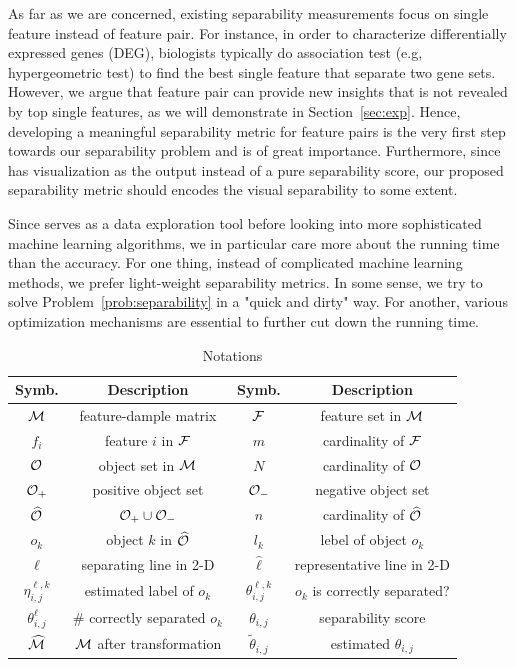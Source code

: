  As far as we are concerned, existing separability measurements focus on single feature instead of feature pair. For instance, in order to characterize differentially expressed genes (DEG), biologists typically do association test (e.g, hypergeometric test) to find the best single feature that separate two gene sets. However, we argue that feature pair can provide new insights that is not revealed by top single features, as we will demonstrate in Section~\ref{sec:exp}. Hence, developing a meaningful separability metric for feature pairs is the very first step towards our separability problem and is of great importance. Furthermore, since \genviz has visualization as the output instead of a pure separability score, our proposed separability metric should encodes the visual separability to some extent. 

 Since \genviz serves as a data exploration tool before looking into more sophisticated machine learning algorithms, we in particular care more about the running time than the accuracy. For one thing, instead of complicated machine learning methods, we prefer light-weight separability metrics. In some sense, we try to solve Problem~\ref{prob:separability} in a "quick and dirty" way. For another, various optimization mechanisms are essential to further cut down the running time.

\begin{table}[t!]
\centering
\small
\begin{tabular}{c|c|c|c}
   Symb. & Description & Symb. & Description\\
    \hline
    \hline
    $\mm$ & feature-dample matrix & $\ff$ & feature set in $\mm$ \\
    \hline
    $f_i$ & feature $i$ in $\ff$ & $m$ & cardinality of $\ff$\\
    \hline
    $\oo$ & object set in $\mm$ & $N$ & cardinality of $\oo$\\
    \hline
    $\oo_+$ & positive object set & $\oo_-$ & negative object set\\
    \hline
    $\widehat{\oo}$ & $\oo_+\cup \oo_-$ & $n$ & cardinality of $\widehat{\oo}$\\
    \hline
    $o_k$ & object $k$ in $\widehat{\oo}$ & $l_k$ & lebel of object $o_k$\\
    \hline
    $\ell$ & separating line in 2-D & $\hat{\ell}$ & representative line  in 2-D\\
    \hline
    $\eta_{i,j}^{\ell,k}$ & estimated label of $o_k$ & $\theta_{i,j}^{\ell,k}$ & $o_k$ is correctly separated? \\
    \hline
    $\theta_{i,j}^{\ell}$ & \# correctly separated $o_k$ & $\theta_{i,j}$ & separability score\\
    \hline
    $\widehat{\mm}$ & $\mm$ after transformation &  $\tilde{\theta}_{i,j}$ & estimated $\theta_{i,j}$\\
    \hline
 \end{tabular}
\vspace{-6pt}
\caption{Notations}
\label{tbl:notation}
\vspace{-18pt}
\end{table}

